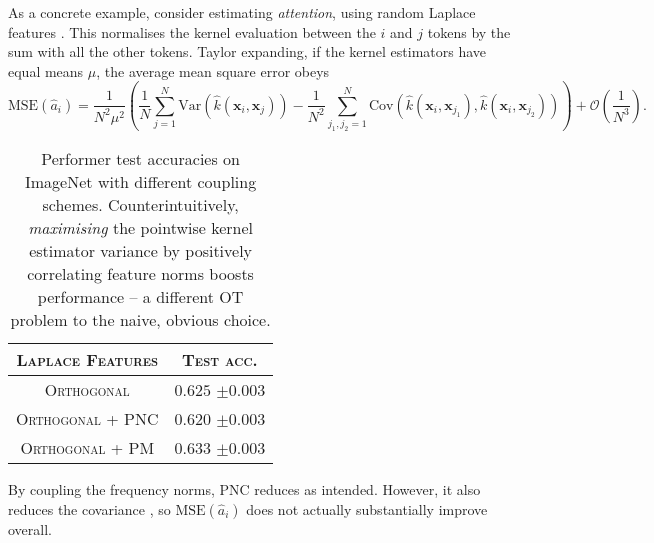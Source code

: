  As a concrete example, consider estimating \emph{attention},  using random Laplace features \citep{choromanski2020rethinking}.
This normalises the kernel evaluation between the $i$ and $j$ tokens by the sum with all the other tokens.
Taylor expanding, if the kernel estimators have equal means $\mu$, the average mean square error  obeys
\small
\begin{equation} \label{eq:biased_attn_approx}
    {\textrm{MSE}(\widehat{a}_{i})} = \frac{1}{N^2 \mu^2} \left( \frac{1}{N} \sum_{j=1}^N 
 \textrm{Var}(\widehat{k}(\boldsymbol{x}_i, \boldsymbol{x}_j)) - \frac{1}{N^2} \sum_{j_1, j_2=1}^N  \textrm{Cov}(\widehat{k}(\boldsymbol{x}_i, \boldsymbol{x}_{j_1}), \widehat{k}(\boldsymbol{x}_i, \boldsymbol{x}_{j_2})) \right) + \mathcal{O}(\frac{1}{N^3}).             
\end{equation}
\normalsize
\begin{wraptable}{r}{0.4\textwidth}
    \centering \vspace{-4.5mm}
    \caption{Performer test accuracies on ImageNet with different coupling schemes.
    Counterintuitively, \emph{maximising} the pointwise kernel estimator variance by positively correlating feature norms boosts performance -- a different OT problem to the naive, obvious choice.} \vspace{-1mm}
    \begin{tabular}{c|c}
        \toprule
        \scshape{\small{Laplace Features}} &\small{\scshape{Test acc.}} \\
        \midrule
        \small{\scshape{Orthogonal}} & $0.625$ {\tiny $\pm 0.003$} \\
        \small{\scshape{Orthogonal + PNC}}  & $0.620$ {\tiny $\pm 0.003$}\\
        \small{\scshape{Orthogonal + PM}}  & $\mathbf{0.633}$ {\tiny $\pm 0.003$} \\
        \bottomrule
    \end{tabular} \label{table:val_prec}
\end{wraptable}By coupling the frequency norms, PNC reduces  as intended.
However, it also reduces the covariance , so ${\textrm{MSE}(\widehat{a}_i)}$ does not actually substantially improve overall.
